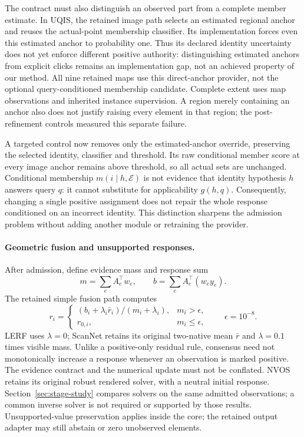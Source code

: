 The contract must also distinguish an observed part from a complete member
estimate. In UQIS, the retained image path selects an estimated regional anchor
and reuses the actual-point membership classifier. Its implementation forces
even this estimated anchor to probability one. Thus its declared identity
uncertainty does not yet enforce different positive authority: distinguishing
estimated anchors from explicit clicks remains an implementation gap, not an
achieved property of our method. All nine retained maps use this direct-anchor
provider, not the optional query-conditioned membership candidate. Complete
extent uses map observations and inherited instance supervision. A region merely
containing an anchor also does not justify raising every element in that region;
the post-refinement controls measured this separate failure.

A targeted control now removes only the estimated-anchor override, preserving
the selected identity, classifier and threshold. Its raw conditional member
score at every image anchor remains above threshold, so all actual sets are
unchanged. Conditional membership $m(i\mid h,\mathcal E)$ is not evidence that
identity hypothesis $h$ answers query $q$: it cannot substitute for applicability
$g(h,q)$. Consequently, changing a single positive assignment does not repair the
whole response conditioned on an incorrect identity. This distinction sharpens
the admission problem without adding another module or retraining the provider.

\paragraph{Geometric fusion and unsupported responses.}
After admission, define evidence mass and response sum
\begin{equation}
 m=\sum_e A_e^\top w_e,\qquad
 b=\sum_e A_e^\top(w_e y_e).
\end{equation}
The retained simple fusion path computes
\begin{equation}
 r_i=\begin{cases}
 (b_i+\lambda_i\bar r_i)/(m_i+\lambda_i),&m_i>\epsilon,\\
 r_{0,i},&m_i\leq\epsilon,
 \end{cases}\qquad \epsilon=10^{-8}.
 \label{eq:consensus}
\end{equation}
LERF uses $\lambda=0$; ScanNet retains its original two-native mean
$\bar r$ and $\lambda=0.1$ times visible mass. Unlike a positive-only residual
rule, consensus need not monotonically increase a response whenever an
observation is marked positive. The evidence contract and the numerical update
must not be conflated. NVOS retains its original robust rendered solver, with
a neutral initial response. Section~\ref{sec:stage-study} compares solvers on
the same admitted observations; a common inverse solver is not required or
supported by those results. Unsupported-value preservation applies inside the
core; the retained output adapter may still abstain or zero unobserved elements.

